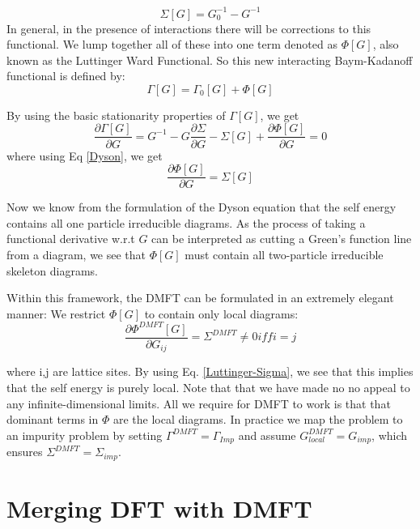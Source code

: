 \documentclass[10pt]{ruthesis}
\begin{document}
\begin{equation}\label{Dyson}
 \Sigma[G]= G_0^{-1}- G^{-1}
\end{equation}
In general, in the presence of interactions there will be corrections to this functional. We lump together all of these into one term denoted as $\Phi[G]$, also known as the Luttinger Ward Functional. So this new interacting Baym-Kadanoff functional is defined by:
\begin{equation}
\Gamma[G]=\Gamma_0[G]+\Phi[G]
\end{equation}

By using the basic stationarity properties of $\Gamma[G]$, we get
\begin{equation}
\dfrac{\partial \Gamma[G]}{\partial G}= G^{-1} -G \dfrac{\partial \Sigma}{\partial G} -\Sigma[G] +\dfrac{\partial \Phi[G]}{\partial G}=0
\end{equation}
 where using Eq \ref{Dyson}, we get
 \begin{equation}\label{Luttinger-Sigma}
 \dfrac{\partial \Phi[G]}{\partial G}=\Sigma[G]
 \end{equation}
 
 Now we know from the formulation of the Dyson equation that the self energy contains all one particle irreducible diagrams. As the process of taking a functional derivative w.r.t $G$ can be interpreted as cutting a Green's function line from a diagram, we see that $\Phi[G]$ must contain all two-particle irreducible skeleton diagrams. 
 
Within this framework, the DMFT can be formulated in an extremely elegant manner: We restrict $\Phi[G]$ to contain only local diagrams:
\begin{equation}
 \dfrac{\partial \Phi^{DMFT}[G]}{\partial G_{ij}} =\Sigma^{DMFT} \neq 0 iff i=j
\end{equation}

where i,j are lattice sites. By using Eq. \ref{Luttinger-Sigma}, we see that this implies that the self energy is purely local. Note that that we have made no no appeal to any infinite-dimensional limits. All we require for DMFT to work is that that dominant terms in $\Phi$ are the local diagrams. In practice we map the problem to an impurity problem by setting  $\Gamma^{DMFT}=\Gamma_{Imp}$ and assume $G^{DMFT}_{local}= G_{imp}$, which ensures $\Sigma^{DMFT}= \Sigma_{imp}$.
 
\section{Merging DFT with DMFT} 
\end{document}
